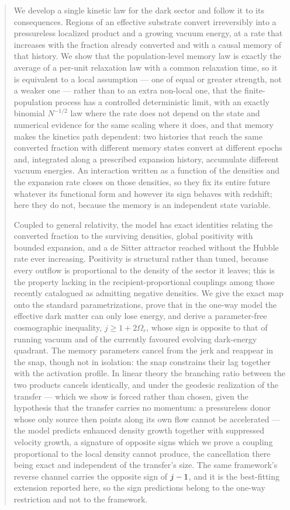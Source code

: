 \begin{abstract}
\noindent
We develop a single kinetic law for the dark sector and follow it to its
consequences. Regions of an effective substrate convert irreversibly into a
pressureless localized product and a growing vacuum energy, at a rate that
increases with the fraction already converted and with a causal memory of that
history. We show that the population-level memory law is exactly the
average of a per-unit relaxation law with a common relaxation time, so it is
equivalent to a local assumption --- one of equal or greater strength, not a
weaker one --- rather than to an extra non-local one, that the
finite-population process has a controlled deterministic limit, with an exactly
binomial $N^{-1/2}$ law where the rate does not depend on the state and
numerical evidence for the same scaling where it does, and that memory makes the kinetics path dependent: two
histories that reach the same converted fraction with different memory states
convert at different epochs and, integrated along a prescribed expansion
history, accumulate different vacuum energies.
An interaction written as a function of the densities and the expansion rate
closes on those densities, so they fix its entire future whatever its
functional form and however its sign behaves with redshift; here they do not,
because the memory is an independent state variable.

Coupled to general relativity, the model has exact identities relating the
converted fraction to the surviving densities, global positivity with bounded
expansion, and a de Sitter attractor reached without the Hubble rate ever
increasing. Positivity is structural rather than tuned, because every outflow
is proportional to the density of the sector it leaves; this is the property
lacking in the recipient-proportional couplings among those recently catalogued
as admitting negative densities. We give the exact map onto the standard
parametrizations, prove that in the one-way model the effective dark matter can only lose energy,
and derive a parameter-free cosmographic inequality, $j \ge 1 + 2\Omega_r$,
whose sign is opposite to that of running vacuum and of the currently favoured
evolving dark-energy quadrant. The memory parameters cancel from the jerk and
reappear in the snap, though not in isolation: the snap constrains their lag
together with the activation profile. In linear theory the branching ratio between the two products
cancels identically, and under the geodesic realization of the transfer ---
which we show is forced rather than chosen, given the hypothesis that the
transfer carries no momentum: a pressureless donor whose only source then
points along its own flow cannot be accelerated --- the model
predicts enhanced density growth together with suppressed velocity growth, a
signature of opposite signs which we prove a coupling proportional to the local
density cannot produce, the cancellation there being exact and independent of
the transfer's size. The same framework's reverse channel carries the opposite
sign of $\jerk-1$, and it is the best-fitting extension reported here, so the
sign predictions belong to the one-way restriction and not to the framework.


\end{abstract}

